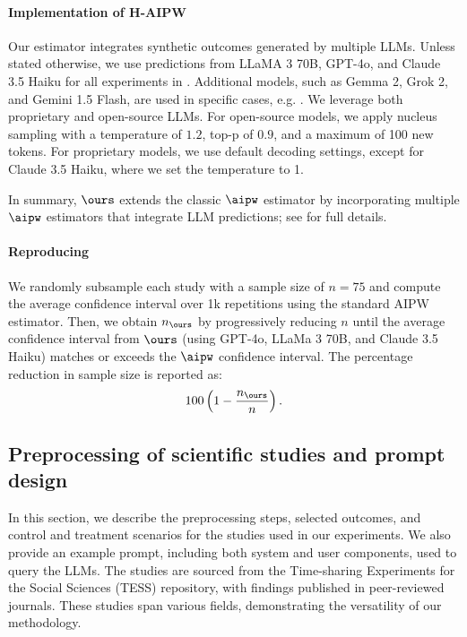\paragraph{Implementation of H-AIPW} 
Our estimator integrates synthetic outcomes generated by multiple LLMs. Unless stated otherwise, we use predictions from LLaMA 3 70B, GPT-4o, and Claude 3.5 Haiku for all experiments in . Additional models, such as Gemma 2, Grok 2, and Gemini 1.5 Flash, are used in specific cases, e.g. . We leverage both proprietary and open-source LLMs. For open-source models, we apply nucleus sampling with a temperature of $1.2$, top-p of $0.9$, and a maximum of 100 new tokens. For proprietary models, we use default decoding settings, except for Claude 3.5 Haiku, where we set the temperature to 1.

In summary, $\ours$ extends the classic $\aipw$ estimator by incorporating multiple $\aipw$ estimators that integrate LLM predictions; see  for full details.


\paragraph{Reproducing~}
We randomly subsample each study with a sample size of \( n = 75 \) and compute the average confidence interval over 1k repetitions using the standard AIPW estimator. Then, we obtain $n_{\ours}$ by progressively reducing \( n \) until the average confidence interval from \(\ours\) (using GPT-4o, LLaMa 3 70B, and Claude 3.5 Haiku) matches or exceeds the $\aipw$ confidence interval. The percentage reduction in sample size is reported as:  
\[
100\left(1 - \frac{n_{\ours}}{n} \right).
\]




\subsection{Preprocessing of scientific studies and prompt design}
\label{apx:prompts}

In this section, we describe the preprocessing steps, selected outcomes, and control and treatment scenarios for the studies used in our experiments. We also provide an example prompt, including both system and user components, used to query the LLMs. The studies are sourced from the Time-sharing Experiments for the Social Sciences (TESS) repository, with findings published in peer-reviewed journals. These studies span various fields, demonstrating the versatility of our methodology.


